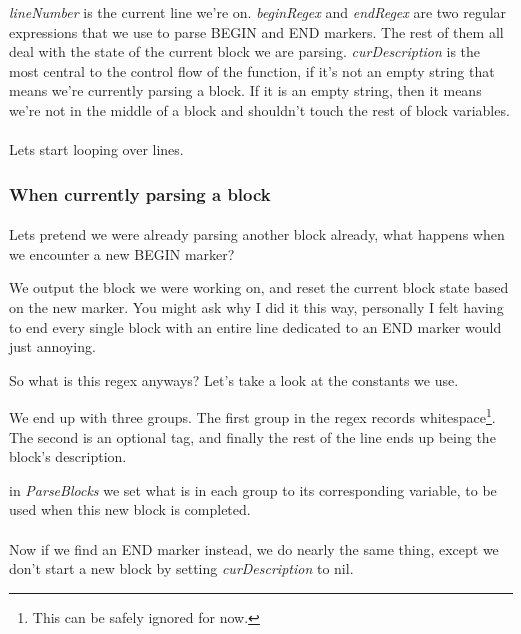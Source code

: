 \documentclass{article}
\begin{document}

\emph{lineNumber} is the current line we're on. \emph{beginRegex} and
\emph{endRegex} are two regular expressions that we use to parse BEGIN and END
markers. The rest of them all deal with the state of the current block we are
parsing. \emph{curDescription} is the most central to the control flow of the
function, if it's not an empty string that means we're currently parsing a block.
If it is an empty string, then it means we're not in the middle of a block and
shouldn't touch the rest of block variables.

\paragraph{}
Lets start looping over lines.


\subsubsection{When currently parsing a block}

\paragraph{}
Lets pretend we were already parsing another block already, what happens when we
encounter a new BEGIN marker?

We output the block we were working on, and reset the current block state based
on the new marker. You might ask why I did it this way, personally I felt having
to end every single block with an entire line dedicated to an END marker would
just annoying.


So what is this regex anyways? Let's take a look at the constants we use.


We end up with three groups. The first group in the regex records
whitespace\footnote{This can be safely ignored for now.}. The second is an
optional tag, and finally the rest of the line ends up being the block's
description.

in \emph{ParseBlocks} we set what is in each group to its corresponding variable,
to be used when this new block is completed.

\paragraph{}
Now if we find an END marker instead, we do nearly the same thing, except we
don't start a new block by setting \emph{curDescription} to nil.
\end{document}
